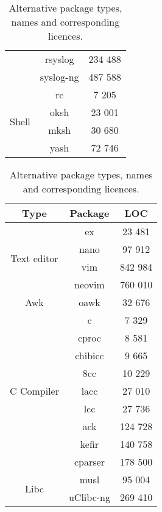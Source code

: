 \begin{table}[!ht]
\begin{tabular}{|c|c|c|}
        \cline{2-3}
        & rsyslog \cite{rsyslog} & 234 488 \\
        \cline{2-3}
        & syslog-ng \cite{syslog-ng} & 487 588 \\
        \hline
        \hline
        \multirow{4}{*}{Shell}
        & rc \cite{rc} & 7 205 \\
        \cline{2-3}
        & oksh \cite{oksh} & 23 001 \\
        \cline{2-3}
        & mksh \cite{mksh} & 30 680 \\
        \cline{2-3}
        & yash \cite{yash} & 72 746 \\
        \hline
    \end{tabular}
    \caption{Alternative package types, names and corresponding licences.}
\end{table}


\newpage

\begin{table}[!ht]
    \centering
    \begin{tabular}{|c|c|c|}
        \hline
        Type & Package & LOC \\
        \hline
        \hline
        \multirow{4}{*}{Text editor}
        & ex \cite{ex-vi} \footnotemark & 23 481 \\
        \cline{2-3}
        & nano \cite{nano} & 97 912 \\
        \cline{2-3}
        & vim \cite{vim} & 842 984 \\
        \cline{2-3}
        & neovim \cite{neovim} & 760 010 \\
        \hline
        \hline
        Awk & oawk \cite{oawk} & 32 676 \\
        \hline
        \hline
        \multirow{9}{*}{C Compiler}
        & c \cite{c} & 7 329 \\
        \cline{2-3}
        & cproc \cite{cproc} & 8 581 \\
        \cline{2-3}
        & chibicc \cite{chibicc} & 9 665 \\
        \cline{2-3}
        & 8cc \cite{8cc} & 10 229 \\
        \cline{2-3}
        & lacc \cite{lacc} & 27 010 \\
        \cline{2-3}
        & lcc \cite{lcc} \footnotemark & 27 736 \\
        \cline{2-3}
        & ack \cite{ack} & 124 728 \\
        \cline{2-3}
        & kefir \cite{kefir} & 140 758 \\
        \cline{2-3}
        & cparser \cite{cparser} & 178 500 \\
        \hline
        \hline
        \multirow{2}{*}{Libc}
        & musl \cite{musl} & 95 004 \\
        \cline{2-3}
        & uClibc-ng \cite{uclibc-ng} & 269 410 \\
        \hline
    \end{tabular}
    \caption{Alternative package types, names and corresponding licences.}
\end{table}


\newpage
